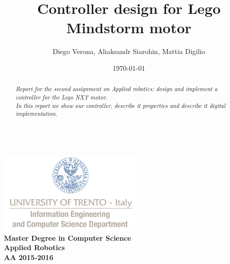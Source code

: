 \documentclass[a4paper,12pt,oneside]{article}
\title{Controller design for Lego Mindstorm motor}
\author{Diego Verona, Aliaksandr Siarohin, Mattia Digilio}
\date{\today}
\begin{document}
\makeatletter  %
\begin{titlepage}
      \centering
      ~~~~~~~~~~~~~\\[-30mm]
      \includegraphics[keepaspectratio=true, width=7cm]{bg_eng_1r.jpg} \\[10mm]

     {
     \large \bfseries Master Degree in Computer Science\\[3mm] 
     Applied Robotics\\[3mm]
     AA 2015-2016
     }\\[10mm]


     \vspace{0.5cm}
     {
     \Large \bfseries \textcolor{blue}{\@title} \par
     }
     \vspace{0.5cm}
     \vspace{0.2cm}

     {\large {\@author}}
     \\ \vspace{.2cm}
     \@date

     \vspace{0.6cm}


\begin{abstract}

\textit{
  Report for the second assignment on Applied robotics: design and implement a controller for the Lego NXT motor.\\In this report we show our controller, describe it properties and describe it digital implementation.
}


\end{abstract}

\end{titlepage}
\end{document}
